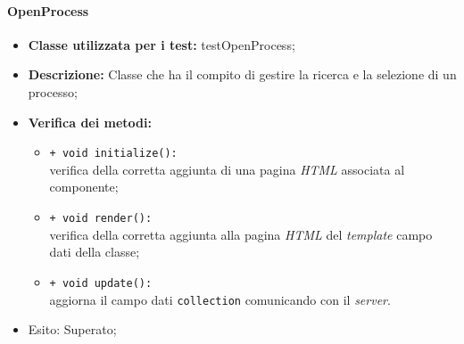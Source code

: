 \paragraph{OpenProcess}
\begin{flushleft}
\begin{itemize}
\item \textbf{Classe utilizzata per i test:} testOpenProcess;
\item \textbf{Descrizione:} Classe che ha il compito di gestire la ricerca e la selezione di un processo;
\item \textbf{Verifica dei metodi:}
\begin{sloppypar}
\begin{itemize}
\item \texttt{+ void initialize():}\\ verifica della corretta aggiunta di una pagina \textit{HTML} associata al componente;
\item \texttt{+ void render():}\\ verifica della corretta aggiunta alla pagina \textit{HTML} del \textit{template} campo dati della classe;
\item \texttt{+ void update():}\\ aggiorna il campo dati \texttt{collection} comunicando con il \textit{server}.
\end{itemize}
\end{sloppypar}
\item Esito: Superato;
\end{itemize}
\end{flushleft}

